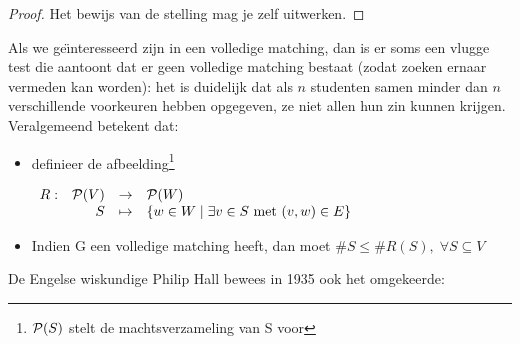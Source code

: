 \begin{proof}
Het bewijs van de stelling mag je zelf uitwerken.
\end{proof}



Als we ge\"{\i}nteresseerd zijn in een volledige matching, dan is er soms
een vlugge test die aantoont dat er geen volledige matching bestaat
(zodat zoeken ernaar vermeden kan worden): het is duidelijk dat als $n$
studenten samen minder dan $n$ verschillende voorkeuren hebben opgegeven, ze niet
allen hun zin kunnen krijgen. Veralgemeend betekent dat:
\begin{itemize}
\item
definieer de afbeelding\footnote{${\cal P}(S)$ stelt de
machtsverzameling van S voor}

\begin{center}
$
\begin{array}{lrcl}
R: & {\cal P}(V) & \rightarrow & {\cal P}(W)\\
   & S    & \mapsto     & 
                \{w\in W \;|\; \exists v \in S \mbox{ met }(v,w) \in E\}
\end{array}
$
\end{center}
\item
Indien G een volledige matching heeft, dan moet $\#S \leq \#R(S),\;
\forall S \subseteq V$
\end{itemize}

De Engelse wiskundige Philip Hall bewees in 1935 ook het omgekeerde:

